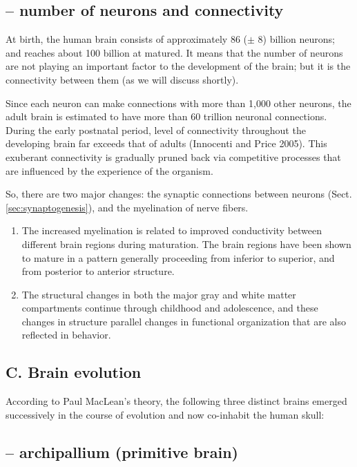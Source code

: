 \subsection{-- number of neurons and connectivity}

At birth, the human brain consists of approximately 86 ($\pm$ 8) billion
neurons; and reaches about 100 billion at matured. It means that the
number of neurons are not playing an important factor to the development of the
brain; but it is the connectivity between them (as we will discuss shortly).


Since each neuron can make connections with more than 1,000 other neurons, the
adult brain is estimated to have more than 60 trillion neuronal connections.
During the early postnatal period, level of connectivity throughout the
developing brain far exceeds that of adults (Innocenti and Price 2005). This
exuberant connectivity is gradually pruned back via competitive processes that
are influenced by the experience of the organism.

So, there are two major changes: the synaptic connections between neurons
(Sect.\ref{sec:synaptogenesis}), and the myelination of nerve fibers.
\begin{enumerate}
  \item  The increased myelination is related to improved conductivity between different
brain regions during maturation. The brain regions have been shown to mature in
a pattern generally proceeding from inferior to superior, and from posterior to
anterior structure.

  \item The structural changes in both the major gray and white matter
  compartments continue through childhood and adolescence, and these changes in
  structure parallel changes in functional organization that are also reflected
  in behavior.
\end{enumerate}



\subsection{C. Brain evolution}
\label{sec:brain_evolution}

According to Paul MacLean's theory, the following three distinct brains emerged
successively in the course of evolution and now co-inhabit the human skull:

\subsection{-- archipallium (primitive brain)}
\label{sec:archipallium}

